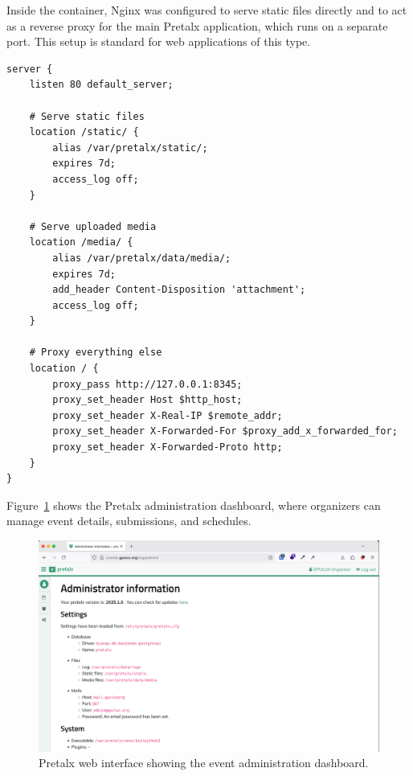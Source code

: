Inside the container, Nginx was configured to serve static files directly and to act as a reverse proxy for the main Pretalx application, which runs on a separate port. This setup is standard for web applications of this type.

\begin{lstlisting}[caption={Pretalx Nginx configuration to proxy the application and serve static files.}]
server {
    listen 80 default_server;

    # Serve static files
    location /static/ {
        alias /var/pretalx/static/;
        expires 7d;
        access_log off;
    }

    # Serve uploaded media
    location /media/ {
        alias /var/pretalx/data/media/;
        expires 7d;
        add_header Content-Disposition 'attachment';
        access_log off;
    }

    # Proxy everything else
    location / {
        proxy_pass http://127.0.0.1:8345;
        proxy_set_header Host $http_host;
        proxy_set_header X-Real-IP $remote_addr;
        proxy_set_header X-Forwarded-For $proxy_add_x_forwarded_for;
        proxy_set_header X-Forwarded-Proto http;
    }
}
\end{lstlisting}

Figure~\ref{fig:pretalx-admin} shows the Pretalx administration dashboard, where organizers can manage event details, submissions, and schedules.

\begin{figure}[H]
	\centering
	\includegraphics[width=\textwidth]{imaxes/pretalx-admin.png}
	\caption{Pretalx web interface showing the event administration dashboard.}
	\label{fig:pretalx-admin}
\end{figure}

